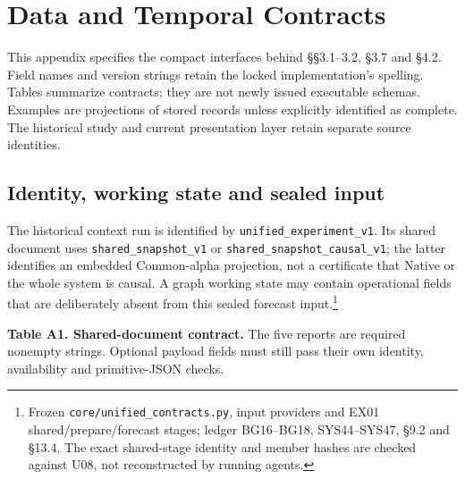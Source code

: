 \chapter{Data and Temporal Contracts}\label{s:28aa573b66b14bbf}

This appendix specifies the compact interfaces behind §§3.1--3.2, §3.7
and §4.2. Field names and version strings retain the locked implementation's
spelling. Tables summarize contracts; they are not newly issued executable
schemas. Examples are projections of stored records unless explicitly
identified as complete. The historical study and current presentation layer
retain separate source identities.

\section{Identity, working state and sealed input}\label{s:b4ac772905cdfa8c}

The historical context run is identified by \texttt{unified\_\allowbreak{}experiment\_\allowbreak{}v1}.
Its shared document uses \texttt{shared\_\allowbreak{}snapshot\_\allowbreak{}v1} or
\texttt{shared\_\allowbreak{}snapshot\_\allowbreak{}causal\_\allowbreak{}v1}; the latter identifies an embedded Common-alpha
projection, not a certificate that Native or the whole system is causal.
A graph working state may contain operational fields that are deliberately
absent from this sealed forecast input.\footnote{Frozen \texttt{core/\allowbreak{}unified\_\allowbreak{}contracts.\allowbreak{}py}, input providers and EX01 shared/prepare/forecast stages; ledger BG16--BG18, SYS44--SYS47, §9.2 and §13.4. The exact shared-stage identity and member hashes are checked against U08, not reconstructed by running agents.}

\textbf{Table A1. Shared-document contract.} The five reports are required
nonempty strings. Optional payload fields must still pass their own
identity, availability and primitive-JSON checks.

\begingroup
\small
{}
\setlength{\tabcolsep}{3pt}

